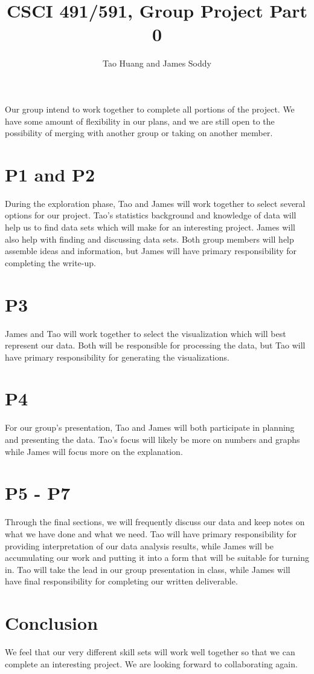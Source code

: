 \documentclass[11pt]{article}
\title{CSCI 491/591, Group Project Part 0}
\author{Tao Huang and James Soddy}
\begin{document}
\maketitle

Our group intend to work together to complete all portions of the project.
We have some amount of flexibility in our plans, and we are
still open to the possibility of merging with another group or taking on
another member.

\section{P1 and P2}

During the exploration phase, Tao and James will work together to select
several options for our project. Tao's statistics background and knowledge
of data will help us to find data sets which will make for an interesting
project. James will also help with finding and discussing data sets. Both
group members will help assemble ideas and information, but James will have
primary responsibility for completing the write-up. 

\section{P3}

James and Tao will work together to select the visualization which
will best represent our data. Both will be responsible for processing
the data, but Tao will have primary responsibility for generating the
visualizations.

\section{P4}

For our group's presentation, Tao and James will both participate in
planning and presenting the data. Tao's focus will likely be more on numbers
and graphs while James will focus more on the explanation.

\section{P5 - P7}

Through the final sections, we will frequently discuss our data and
keep notes on  what we have done and what we need. Tao will have primary
responsibility for providing interpretation of our data analysis results,
while James will be accumulating our work and putting it into a form that
will be suitable for turning in. Tao will take the lead in our group
presentation in class, while James will have final responsibility for
completing our written deliverable.

\section{Conclusion}

We feel that our very different skill sets will work well together so
that we can complete an interesting project. We are looking forward to
collaborating again.
\end{document}
